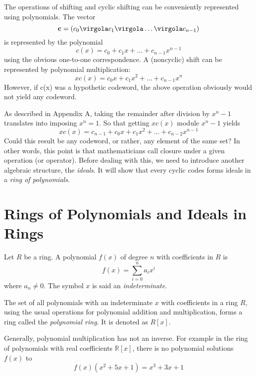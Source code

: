 The operations of shifting and cyclic shifting can be conveniently represented using polynomials. The vector
\begin{equation}
 \vet{c}=(c_0 \virgola c_1 \virgola \ldots \virgola c_{n-1})
\end{equation}
is represented by the polynomial
\begin{equation}
c(x) = c_0 + c_1x+\ldots+c_{n-1}x^{n-1}
\end{equation}
using the obvious one-to-one correspondence.
A (noncyclic) shift can be represented by polynomial multiplication:
\begin{equation}
xc(x)= c_0x + c_1x^2+\ldots+c_{n-1}x^{n}
\end{equation}
However, if c(x) was a hypothetic codeword, the above operation obviously would not yield any codeword.

As described in Appendix A, taking the remainder after division by \(x^n-1\) translates into imposing \(x^n=1\). So that getting \(xc(x) \) module \(x^n-1\) yields
\begin{equation}
xc(x)=c_{n-1} + c_0x + c_1x^2+\ldots+ c_{n-2}x^{n-1}
\end{equation}
Could this result be any codeword, or rather, any element of the same set? In other words, this point is that mathematicians call closure under a given operation (or operator).
Before dealing with this, we need to introduce another algebraic structure, the \emph{ideals}. It will show that every cyclic codes forms ideals in a \emph{ring of polynomials}.



\section{Rings of Polynomials and Ideals in Rings} \label{sec:ideals}

Let $R$ be a ring. A polynomial \( f(x) \) of degree $n$ with coefficients in $R$ is
\begin{equation}
f(x) = \sum^{n}_{i=0}{a_ix^i}
\end{equation}
where \( a_n \neq 0 \). The symbol $x$ is said an \emph{indeterminate}.

\begin{Def}
The set of all polynomials with an indeterminate $x$ with coefficients in a ring $R$, using the usual operations for polynomial addition and multiplication, forms a ring called the \emph{polynomial ring}. It is denoted as $R[x]$.
\end{Def}
Generally, polynomial multiplication has not an inverse. For example in the ring of polynomials with real coefficients $\mathbb R [x]$, there is no polynomial solutions $f(x)$ to
\[
f(x)(x^2+5x+1) = x^3+3x+1
\]


